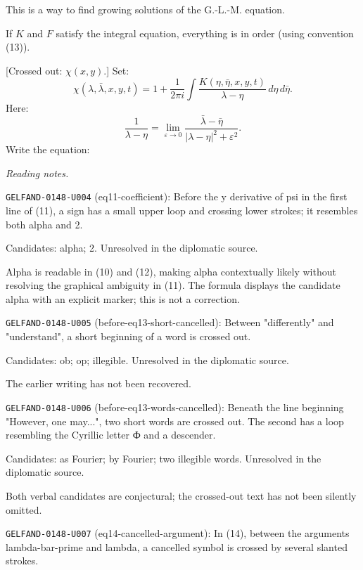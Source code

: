 This is a way to find growing solutions of the G.-L.-M. equation.

If $K$ and $F$ satisfy the integral equation, everything is in order
(using convention (13)).

[Crossed out: $\chi(x,y)$.] Set:
\begin{equation*}
\chi(\lambda,\bar\lambda,x,y,t)=1+\frac1{2\pi i}
\int\frac{K(\eta,\bar\eta,x,y,t)}{\lambda-\eta}\,d\eta\,d\bar\eta. \tag{16}
\end{equation*}
Here:
\begin{equation*}
\frac1{\lambda-\eta}=\lim_{\varepsilon\to0}
\frac{\bar\lambda-\bar\eta}{|\lambda-\eta|^2+\varepsilon^2}. \tag{17}
\end{equation*}
Write the equation:


\par\smallskip\noindent\textit{Reading notes.}\par
\noindent\texttt{GELFAND-0148-U004} (eq11-coefficient): Before the y derivative of psi in the first line of (11), a sign has a small upper loop and crossing lower strokes; it resembles both alpha and 2.\par
Candidates: alpha; 2. Unresolved in the diplomatic source.\par
Alpha is readable in (10) and (12), making alpha contextually likely without resolving the graphical ambiguity in (11). The formula displays the candidate alpha with an explicit marker; this is not a correction.\par
\noindent\texttt{GELFAND-0148-U005} (before-eq13-short-cancelled): Between "differently" and "understand", a short beginning of a word is crossed out.\par
Candidates: ob; op; illegible. Unresolved in the diplomatic source.\par
The earlier writing has not been recovered.\par
\noindent\texttt{GELFAND-0148-U006} (before-eq13-words-cancelled): Beneath the line beginning "However, one may...", two short words are crossed out. The second has a loop resembling the Cyrillic letter Ф and a descender.\par
Candidates: as Fourier; by Fourier; two illegible words. Unresolved in the diplomatic source.\par
Both verbal candidates are conjectural; the crossed-out text has not been silently omitted.\par
\noindent\texttt{GELFAND-0148-U007} (eq14-cancelled-argument): In (14), between the arguments lambda-bar-prime and lambda, a cancelled symbol is crossed by several slanted strokes.\par
